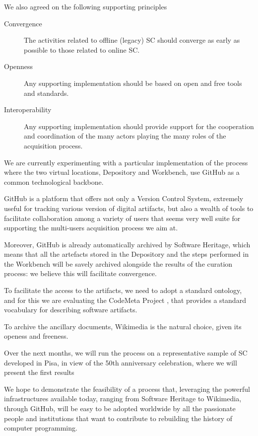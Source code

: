 \documentclass[a4paper]{article}
\begin{document}
We also agreed on the following supporting principles

\begin{description}
	\item[Convergence] The activities related to offline (legacy) SC should converge as early as possible to those related to online SC.
	\item[Openness] Any supporting implementation should be 
	based on open and free tools and standards.
	\item[Interoperability] Any supporting implementation should provide support for 
the cooperation and coordination of the many actors playing the many roles of the acquisition process.	
\end{description}

\noindent
We are currently experimenting with a particular implementation of the process where the two virtual locations, Depository and Workbench, use GitHub as a common technological backbone.

GitHub is a platform that offers not only a Version Control System, extremely
useful for tracking various version of digital artifacts, but also a wealth of
tools to facilitate collaboration among a variety of users that seems very well
suite for supporting the multi-users acquisition process we aim at.

Moreover, GitHub is already automatically archived by Software Heritage, which
means that all the artefacts stored in the Depository and the steps performed in
the Workbench will be savely archived alongside the results of the curation process:
we believe this will facilitate convergence.

To facilitate the access to the artifacts, we need to adopt a standard ontology, and
for this we are evaluating the CodeMeta Project \cite{CodeMeta}, that provides a
standard vocabulary for describing software artifacts.

\noindent
To archive the ancillary documents, Wikimedia \cite{wiki:Wikimedia_movement} is the natural choice, given its openess and freeness.  


Over the next months, we will run the process on a representative sample of SC
developed in Pisa, in view of the 50th anniversary celebration, where we will
present the first results

We hope to demonstrate the feasibility of a process that, leveraging the
powerful infrastructures available today, ranging from Software Heritage to
Wikimedia, through GitHub, will be easy to be adopted worldwide by all the
passionate people and institutions that want to contribute to rebuilding
the history of computer programming.
\end{document}
